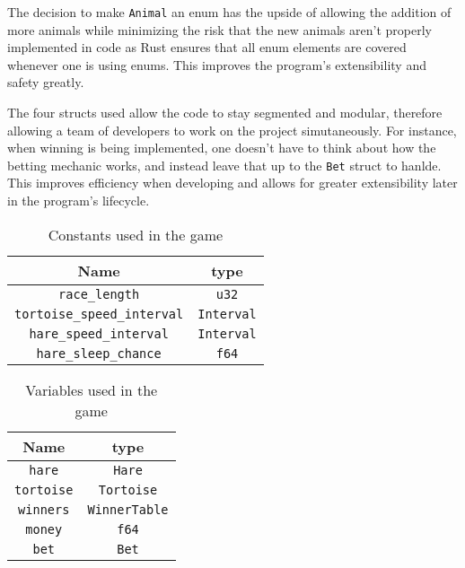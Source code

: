 \documentclass[11pt]{article}
\begin{document}
The decision to make \texttt{Animal} an enum has the upside of allowing the addition of  more animals
while minimizing the risk that the new animals aren't properly implemented in code as Rust ensures that
all enum elements are covered whenever one is using enums. This improves the program's extensibility
and safety greatly.

The four structs used allow the code to stay segmented and modular, therefore allowing a team of developers
to work on the project simutaneously. For instance, when winning is being implemented, one doesn't have
to think about how the betting mechanic works, and instead leave that up to the \texttt{Bet} struct
to hanlde. This improves efficiency when developing and allows for greater extensibility later in the
program's lifecycle.

\begin{table}[!ht]
	\centering
	\begin{tabular}{ | c c | }
		\hline
		Name                               & type              \\
		\hline
		\texttt{race\_length}              & \texttt{u32}      \\
		\texttt{tortoise\_speed\_interval} & \texttt{Interval} \\
		\texttt{hare\_speed\_interval}     & \texttt{Interval} \\
		\texttt{hare\_sleep\_chance}       & \texttt{f64}      \\
		\hline
	\end{tabular}
	\caption{Constants used in the game}%
	\label{tab:consts}
\end{table}
\begin{table}[!ht]
	\centering
	\begin{tabular}{ | c c | }
		\hline
		Name              & type                 \\ \hline
		\texttt{hare}     & \texttt{Hare}        \\
		\texttt{tortoise} & \texttt{Tortoise}    \\
		\texttt{winners}  & \texttt{WinnerTable} \\
		\texttt{money}    & \texttt{f64}         \\
		\texttt{bet}      & \texttt{Bet}         \\ \hline
	\end{tabular}
	\caption{Variables used in the game}
	\label{tab:vars}
\end{table}
\end{document}
